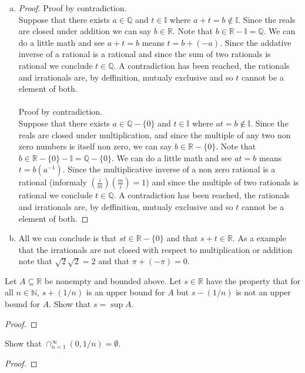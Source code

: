 \documentclass[12pt]{article}
\makeatletter
\theoremstyle{homework}
\newenvironment{exercise}[1]
{\def\@currentlabel{#1}\exercisecore}
{\endexercisecore}
\newcommand{\Reals}{\ensuremath{\mathbb R}}
\newcommand{\Nats}{\ensuremath{\mathbb N}}
\newcommand{\Rats}{\ensuremath{\mathbb Q}}
\makeatother
\begin{document}
\begin{enumerate}[(a)]
\item \begin{proof}
Proof by contradiction.\\
Suppose that there exists $a\in\Rats$ and $t\in\mathbb{I}$ where $a+t=b\notin\mathbb{I}$.  Since the reals are closed under addition we can say $b\in\mathbb{R}$.  Note that $b\in\mathbb{R} -\mathbb{I}=\mathbb{Q}$.  We can do a little math and see $a+t=b$ means $t=b+(-a)$.  Since the addative inverse of a rational is a rational and since the sum of two rationals is rational we conclude $t\in \mathbb{Q}$.  A contradiction has been reached, the rationals and irrationals are, by deffinition, mutualy exclusive and so $t$ cannot be a element of both.\\\\
Proof by contradiction.\\
Suppose that there exists $a\in\Rats-\{0\}$ and $t\in\mathbb{I}$ where $at=b\notin\mathbb{I}$.  Since the reals are closed under multiplication, and since the multiple of any two non zero numbers is itself non zero, we can say $b\in\mathbb{R}-\{0\}$.  Note that $b\in\mathbb{R}-\{0\} -\mathbb{I}=\mathbb{Q}-\{0\}$.  We can do a little math and see $at=b$ means $t=b(a^{-1})$.  Since the multiplicative inverse of a non zero rational is a rational (informaly $(\frac{i}{m})(\frac{m}{i})=1$) and since the multiple of two rationals is rational we conclude $t\in \mathbb{Q}$.  A contradiction has been reached, the rationals and irrationals are, by deffinition, mutualy exclusive and so $t$ cannot be a element of both.
\end{proof}

\item 
All we can conclude is that $st\in \mathbb{R}-\{0\}$ and that $s+t\in \mathbb{R}$.  As a example that the irrationals are not closed with respect to multiplication or addition note that $\sqrt{2}\sqrt{2}=2$ and that $\pi+(-\pi)=0$.
\end{enumerate}

\begin{exercise}{1.4.2}
Let $A\subseteq \Reals$ be nonempty and bounded above. Let $s\in\Reals$ have
the property that for all $n\in\Nats$, $s+(1/n)$ is an upper bound for $A$
but $s-(1/n)$ is not an upper bound for $A$.  Show that $s=\sup A$.
\end{exercise}
\begin{proof}
\end{proof}

\begin{exercise}{1.4.3} Show that $\cap_{n=1}^\infty (0,1/n)=\emptyset$.
\end{exercise}
\begin{proof}
\end{proof}
\end{document}
